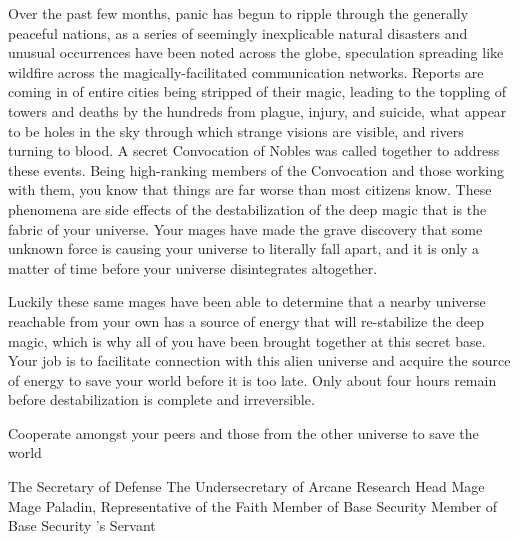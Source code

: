 \documentclass[blue]{guildcamp3}
\begin{document}
Over the past few months, panic has begun to ripple through the generally peaceful nations, as a series of seemingly inexplicable natural disasters and unusual occurrences have been noted across the globe, speculation spreading like wildfire across the magically-facilitated communication networks. Reports are coming in of entire cities being stripped of their magic, leading to the toppling of towers and deaths by the hundreds from plague, injury, and suicide, what appear to be holes in the sky through which strange visions are visible, and rivers turning to blood. A secret Convocation of Nobles was called together to address these events. Being high-ranking members of the Convocation and those working with them, you know that things are far worse than most citizens know. These phenomena are side effects of the destabilization of the deep magic that is the fabric of your universe. Your mages have made the grave discovery that some unknown force is causing your universe to literally fall apart, and it is only a matter of time before your universe disintegrates altogether.

Luckily these same mages have been able to determine that a nearby universe reachable from your own has a source of energy that will re-stabilize the deep magic, which is why all of you have been brought together at this secret base. Your job is to facilitate connection with this alien universe and acquire the source of energy to save your world before it is too late. Only about four hours remain before destabilization is complete and irreversible.

\begin{itemz}[Goals]
	\item Cooperate amongst your peers and those from the other universe to save the world
\end{itemz}


\begin{members}
	\member{\cNobleOne{}} The Secretary of Defense
	\member{\cNobleTwo{}} The Undersecretary of Arcane Research
	\member{\cMageOne{}} Head Mage
	\member{\cMageTwo{}} Mage
	\member{\cPaladin{}} Paladin, Representative of the Faith
	\member{\cRogueOne{}} Member of Base Security
	\member{\cRogueTwo{}} Member of Base Security
	\member{\cServant{}} \cNobleOne{}'s Servant
\end{members}
\end{document}
